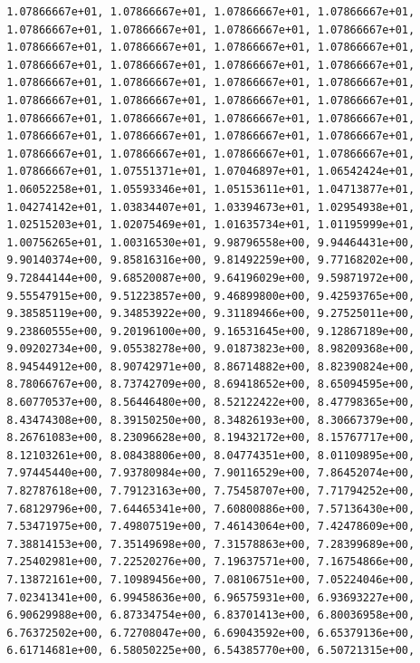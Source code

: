 \documentclass[
  letterpaper,
]{scrreprt}
\begin{document}
\begin{verbatim}
       1.07866667e+01, 1.07866667e+01, 1.07866667e+01, 1.07866667e+01,
       1.07866667e+01, 1.07866667e+01, 1.07866667e+01, 1.07866667e+01,
       1.07866667e+01, 1.07866667e+01, 1.07866667e+01, 1.07866667e+01,
       1.07866667e+01, 1.07866667e+01, 1.07866667e+01, 1.07866667e+01,
       1.07866667e+01, 1.07866667e+01, 1.07866667e+01, 1.07866667e+01,
       1.07866667e+01, 1.07866667e+01, 1.07866667e+01, 1.07866667e+01,
       1.07866667e+01, 1.07866667e+01, 1.07866667e+01, 1.07866667e+01,
       1.07866667e+01, 1.07866667e+01, 1.07866667e+01, 1.07866667e+01,
       1.07866667e+01, 1.07866667e+01, 1.07866667e+01, 1.07866667e+01,
       1.07866667e+01, 1.07551371e+01, 1.07046897e+01, 1.06542424e+01,
       1.06052258e+01, 1.05593346e+01, 1.05153611e+01, 1.04713877e+01,
       1.04274142e+01, 1.03834407e+01, 1.03394673e+01, 1.02954938e+01,
       1.02515203e+01, 1.02075469e+01, 1.01635734e+01, 1.01195999e+01,
       1.00756265e+01, 1.00316530e+01, 9.98796558e+00, 9.94464431e+00,
       9.90140374e+00, 9.85816316e+00, 9.81492259e+00, 9.77168202e+00,
       9.72844144e+00, 9.68520087e+00, 9.64196029e+00, 9.59871972e+00,
       9.55547915e+00, 9.51223857e+00, 9.46899800e+00, 9.42593765e+00,
       9.38585119e+00, 9.34853922e+00, 9.31189466e+00, 9.27525011e+00,
       9.23860555e+00, 9.20196100e+00, 9.16531645e+00, 9.12867189e+00,
       9.09202734e+00, 9.05538278e+00, 9.01873823e+00, 8.98209368e+00,
       8.94544912e+00, 8.90742971e+00, 8.86714882e+00, 8.82390824e+00,
       8.78066767e+00, 8.73742709e+00, 8.69418652e+00, 8.65094595e+00,
       8.60770537e+00, 8.56446480e+00, 8.52122422e+00, 8.47798365e+00,
       8.43474308e+00, 8.39150250e+00, 8.34826193e+00, 8.30667379e+00,
       8.26761083e+00, 8.23096628e+00, 8.19432172e+00, 8.15767717e+00,
       8.12103261e+00, 8.08438806e+00, 8.04774351e+00, 8.01109895e+00,
       7.97445440e+00, 7.93780984e+00, 7.90116529e+00, 7.86452074e+00,
       7.82787618e+00, 7.79123163e+00, 7.75458707e+00, 7.71794252e+00,
       7.68129796e+00, 7.64465341e+00, 7.60800886e+00, 7.57136430e+00,
       7.53471975e+00, 7.49807519e+00, 7.46143064e+00, 7.42478609e+00,
       7.38814153e+00, 7.35149698e+00, 7.31578863e+00, 7.28399689e+00,
       7.25402981e+00, 7.22520276e+00, 7.19637571e+00, 7.16754866e+00,
       7.13872161e+00, 7.10989456e+00, 7.08106751e+00, 7.05224046e+00,
       7.02341341e+00, 6.99458636e+00, 6.96575931e+00, 6.93693227e+00,
       6.90629988e+00, 6.87334754e+00, 6.83701413e+00, 6.80036958e+00,
       6.76372502e+00, 6.72708047e+00, 6.69043592e+00, 6.65379136e+00,
       6.61714681e+00, 6.58050225e+00, 6.54385770e+00, 6.50721315e+00,

\end{verbatim}
\end{document}
